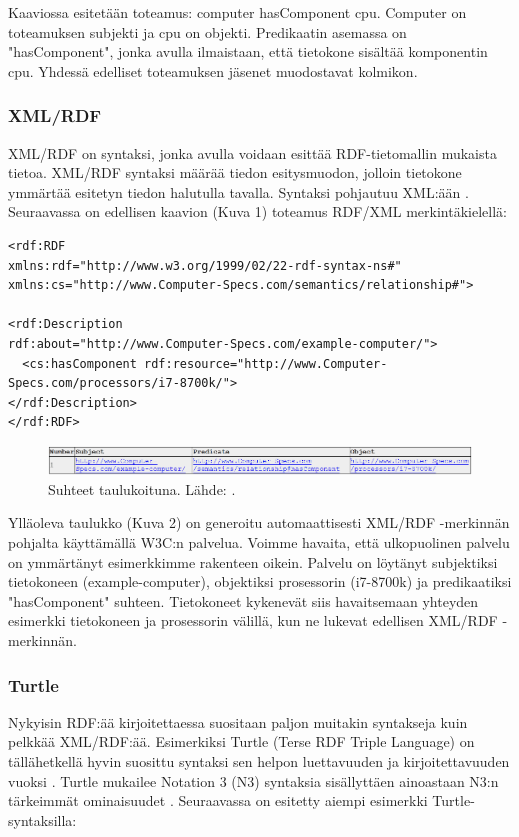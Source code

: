 \documentclass[finnish, 12pt, a4paper, elec, utf8, pdfa, online]{aaltothesis}
\begin{document}
Kaaviossa esitetään toteamus: computer hasComponent cpu. Computer on toteamuksen subjekti ja cpu on objekti. Predikaatin asemassa on "hasComponent", jonka avulla ilmaistaan, että tietokone sisältää komponentin cpu. Yhdessä edelliset toteamuksen jäsenet muodostavat kolmikon.



\subsubsection{XML/RDF}
XML/RDF on syntaksi, jonka avulla voidaan esittää RDF-tietomallin mukaista tietoa. XML/RDF syntaksi määrää tiedon esitysmuodon, jolloin tietokone ymmärtää esitetyn tiedon halutulla tavalla. Syntaksi pohjautuu XML:ään \cite{RDF_XML}. Seuraavassa on edellisen kaavion (Kuva 1) toteamus RDF/XML merkintäkielellä:

\vskip 0.75cm
\begin{lstlisting}[style=codeblock]
<rdf:RDF
xmlns:rdf="http://www.w3.org/1999/02/22-rdf-syntax-ns#"
xmlns:cs="http://www.Computer-Specs.com/semantics/relationship#">

<rdf:Description
rdf:about="http://www.Computer-Specs.com/example-computer/">
  <cs:hasComponent rdf:resource="http://www.Computer-Specs.com/processors/i7-8700k/">
</rdf:Description>
</rdf:RDF>
\end{lstlisting}
\vskip 0.75cm


\begin{figure}[htb]
\centering
\includegraphics[width=15cm]{images/RDF-valid.PNG}
\caption{Suhteet taulukoituna. Lähde: \cite{W3C_RDF_validator}. \label{images/RDF-valid}}
\end{figure}

Ylläoleva taulukko (Kuva 2) on generoitu automaattisesti XML/RDF -merkinnän pohjalta käyttämällä W3C:n palvelua. Voimme havaita, että ulkopuolinen palvelu on ymmärtänyt esimerkkimme rakenteen oikein. Palvelu on löytänyt subjektiksi tietokoneen (example-computer), objektiksi prosessorin (i7-8700k) ja predikaatiksi "hasComponent" suhteen. Tietokoneet kykenevät siis havaitsemaan yhteyden esimerkki tietokoneen ja prosessorin välillä, kun ne lukevat edellisen XML/RDF -merkinnän.

\subsubsection{Turtle}
Nykyisin RDF:ää kirjoitettaessa suositaan paljon muitakin syntakseja kuin pelkkää XML/RDF:ää. Esimerkiksi Turtle (Terse RDF Triple Language) on tällähetkellä hyvin suosittu syntaksi sen helpon luettavuuden ja kirjoitettavuuden vuoksi \cite{cambridge2}. Turtle mukailee Notation 3 (N3) syntaksia sisällyttäen ainoastaan N3:n tärkeimmät ominaisuudet \cite{W3C_turtle}. Seuraavassa on esitetty aiempi esimerkki Turtle-syntaksilla:
\end{document}

